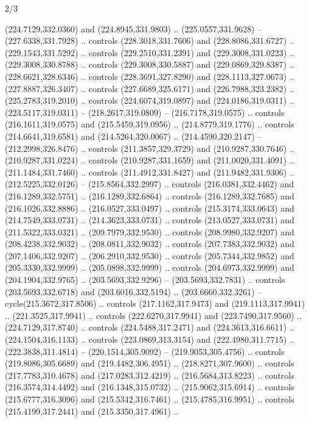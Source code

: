 \begin{flagdescription}{2/3}
\begin{scope}[xshift=0.5\flaglength,yshift=0.5\flagwidth,scale=\flagwidth/311.22]
\begin{scope}[y=0.8pt, x=0.8pt, yscale=-1,shift={(-291.77,-194.51)}]
  (224.7129,332.0360) and (224.8945,331.9803) .. (225.0557,331.9628) --
  (227.6338,331.7928) .. controls (228.3018,331.7606) and (228.8086,331.6727) ..
  (229.1543,331.5292) .. controls (229.2510,331.2391) and (229.3008,331.0223) ..
  (229.3008,330.8788) .. controls (229.3008,330.5887) and (229.0869,329.8387) ..
  (228.6621,328.6346) .. controls (228.3691,327.8290) and (228.1113,327.0673) ..
  (227.8887,326.3407) .. controls (227.6689,325.6171) and (226.7988,323.2382) ..
  (225.2783,319.2010) .. controls (224.6074,319.0897) and (224.0186,319.0311) ..
  (223.5117,319.0311) -- (218.2617,319.0809) -- (216.7178,319.0575) .. controls
  (216.1611,319.0575) and (215.5459,319.0956) .. (214.8779,319.1776) .. controls
  (214.6641,319.6581) and (214.5264,320.0067) .. (214.4590,320.2147) --
  (212.2998,326.8476) .. controls (211.3857,329.3729) and (210.9287,330.7646) ..
  (210.9287,331.0224) .. controls (210.9287,331.1659) and (211.0020,331.4091) ..
  (211.1484,331.7460) .. controls (211.4912,331.8427) and (211.9482,331.9306) ..
  (212.5225,332.0126) -- (215.8564,332.2997) .. controls (216.0381,332.4462) and
  (216.1289,332.5751) .. (216.1289,332.6864) .. controls (216.1289,332.7685) and
  (216.1026,332.8886) .. (216.0527,333.0497) .. controls (215.3174,333.0643) and
  (214.7549,333.0731) .. (214.3623,333.0731) .. controls (213.0527,333.0731) and
  (211.5322,333.0321) .. (209.7979,332.9530) .. controls (208.9980,332.9207) and
  (208.4238,332.9032) .. (208.0811,332.9032) .. controls (207.7383,332.9032) and
  (207.1406,332.9207) .. (206.2910,332.9530) .. controls (205.7344,332.9852) and
  (205.3330,332.9999) .. (205.0898,332.9999) .. controls (204.6973,332.9999) and
  (204.1904,332.9765) .. (203.5693,332.9296) -- (203.5693,332.7831) .. controls
  (203.5693,332.6718) and (203.6016,332.5194) .. (203.6660,332.3261) --
  cycle(215.3672,317.8506) .. controls (217.1162,317.9473) and
  (219.1113,317.9941) .. (221.3525,317.9941) .. controls (222.6270,317.9941) and
  (223.7490,317.9560) .. (224.7129,317.8740) .. controls (224.5488,317.2471) and
  (224.3613,316.6611) .. (224.1504,316.1133) .. controls (223.0869,313.3154) and
  (222.4980,311.7715) .. (222.3838,311.4814) -- (220.1514,305.9092) --
  (219.9053,305.4756) .. controls (219.8086,305.6689) and (219.4482,306.4951) ..
  (218.8271,307.9600) .. controls (217.7783,310.4678) and (217.0283,312.4219) ..
  (216.5684,313.8223) .. controls (216.3574,314.4492) and (216.1348,315.0732) ..
  (215.9062,315.6914) .. controls (215.6777,316.3096) and (215.5342,316.7461) ..
  (215.4785,316.9951) .. controls (215.4199,317.2441) and (215.3350,317.4961) ..

\end{scope}
\end{scope}
\end{flagdescription}
